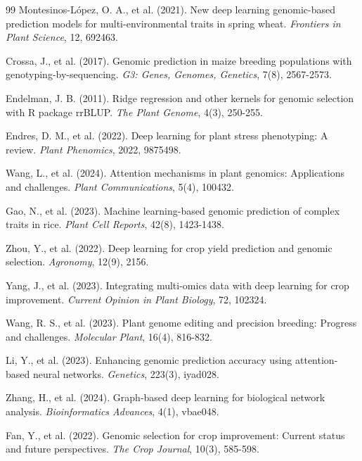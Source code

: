 \documentclass[11pt,a4paper]{article}
\begin{document}
\begin{thebibliography}{99}
Montesinos-L\'{o}pez, O. A., et al. (2021).
New deep learning genomic-based prediction models for multi-environmental traits in spring wheat.
\textit{Frontiers in Plant Science}, 12, 692463.

Crossa, J., et al. (2017).
Genomic prediction in maize breeding populations with genotyping-by-sequencing.
\textit{G3: Genes, Genomes, Genetics}, 7(8), 2567-2573.

Endelman, J. B. (2011).
Ridge regression and other kernels for genomic selection with R package rrBLUP.
\textit{The Plant Genome}, 4(3), 250-255.

Endres, D. M., et al. (2022).
Deep learning for plant stress phenotyping: A review.
\textit{Plant Phenomics}, 2022, 9875498.

Wang, L., et al. (2024).
Attention mechanisms in plant genomics: Applications and challenges.
\textit{Plant Communications}, 5(4), 100432.

Gao, N., et al. (2023).
Machine learning-based genomic prediction of complex traits in rice.
\textit{Plant Cell Reports}, 42(8), 1423-1438.

Zhou, Y., et al. (2022).
Deep learning for crop yield prediction and genomic selection.
\textit{Agronomy}, 12(9), 2156.

Yang, J., et al. (2023).
Integrating multi-omics data with deep learning for crop improvement.
\textit{Current Opinion in Plant Biology}, 72, 102324.

Wang, R. S., et al. (2023).
Plant genome editing and precision breeding: Progress and challenges.
\textit{Molecular Plant}, 16(4), 816-832.

Li, Y., et al. (2023).
Enhancing genomic prediction accuracy using attention-based neural networks.
\textit{Genetics}, 223(3), iyad028.

Zhang, H., et al. (2024).
Graph-based deep learning for biological network analysis.
\textit{Bioinformatics Advances}, 4(1), vbae048.

Fan, Y., et al. (2022).
Genomic selection for crop improvement: Current status and future perspectives.
\textit{The Crop Journal}, 10(3), 585-598.

\end{thebibliography}
\end{document}
